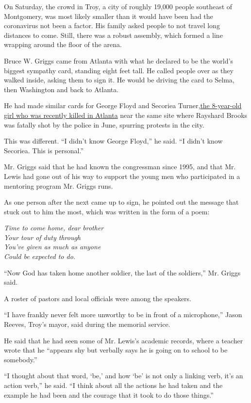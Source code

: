 On Saturday, the crowd in Troy, a city of roughly 19,000 people
southeast of Montgomery, was most likely smaller than it would have been
had the coronavirus not been a factor. His family asked people to not
travel long distances to come. Still, there was a robust assembly, which
formed a line wrapping around the floor of the arena.

Bruce W. Griggs came from Atlanta with what he declared to be the
world's biggest sympathy card, standing eight feet tall. He called
people over as they walked inside, asking them to sign it. He would be
driving the card to Selma, then Washington and back to Atlanta.

He had made similar cards for George Floyd and Secoriea
Turner,\href{https://www.nytimes3xbfgragh.onion/2020/07/06/us/atlanta-mayor-8-year-old-killed.html}{the
8-year-old girl who was recently killed in Atlanta} near the same site
where Rayshard Brooks was fatally shot by the police in June, spurring
protests in the city.

This was different. ``I didn't know George Floyd,'' he said. ``I didn't
know Secoriea. This is personal.''

Mr. Griggs said that he had known the congressman since 1995, and that
Mr. Lewis had gone out of his way to support the young men who
participated in a mentoring program Mr. Griggs runs.

As one person after the next came up to sign, he pointed out the message
that stuck out to him the most, which was written in the form of a poem:

\emph{Time to come home, dear brother}\\
\emph{Your tour of duty through}\\
\emph{You've given as much as anyone}\\
\emph{Could be expected to do.}

``Now God has taken home another soldier, the last of the soldiers,''
Mr. Griggs said.

A roster of pastors and local officials were among the speakers.

``I have frankly never felt more unworthy to be in front of a
microphone,'' Jason Reeves, Troy's mayor, said during the memorial
service.

He said that he had seen some of Mr. Lewis's academic records, where a
teacher wrote that he ``appears shy but verbally says he is going on to
school to be somebody.''

``I thought about that word, `be,' and how `be' is not only a linking
verb, it's an action verb,'' he said. ``I think about all the actions he
had taken and the example he had been and the courage that it took to do
those things.''

